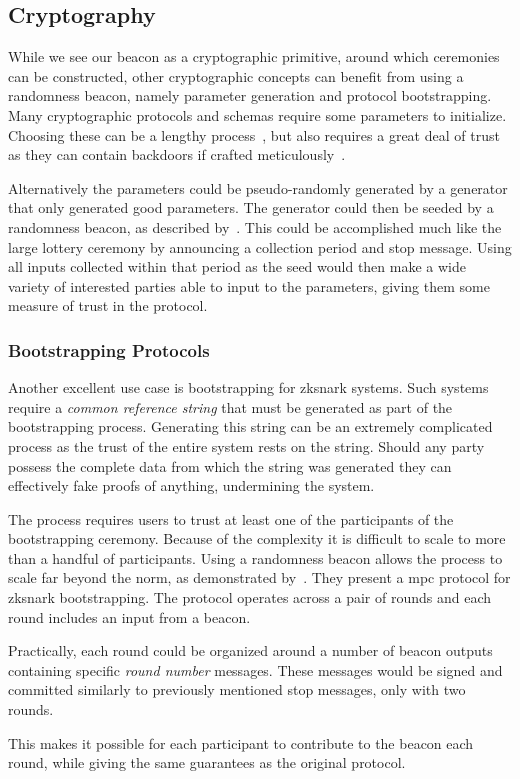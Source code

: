 \subsection{Cryptography}
While we see our beacon as a cryptographic primitive, around which ceremonies can be constructed, other cryptographic concepts can benefit from using a randomness beacon, namely parameter generation and protocol bootstrapping.
Many cryptographic protocols and schemas require some parameters to initialize.
Choosing these can be a lengthy process~\cite{mpcsnarks}, but also requires a great deal of trust as they can contain backdoors if crafted meticulously~\cite{nist2014backdoor}.

Alternatively the parameters could be pseudo-randomly generated by a generator that only generated good parameters.
The generator could then be seeded by a randomness beacon, as described by~\citet{baigneres2015trap}.
This could be accomplished much like the large lottery ceremony by announcing a collection period and stop message.
Using all inputs collected within that period as the seed would then make a wide variety of interested parties able to input to the parameters, giving them some measure of trust in the protocol.

\subsubsection{Bootstrapping Protocols}%
\label{ssub:bootstrapping_protocols}
Another excellent use case is bootstrapping for \gls{zksnark} systems.
Such systems require a \emph{common reference string} that must be generated as part of the bootstrapping process.
Generating this string can be an extremely complicated process as the trust of the entire system rests on the string.
Should any party possess the complete data from which the string was generated they can effectively fake proofs of anything, undermining the system.

The process requires users to trust at least one of the participants of the bootstrapping ceremony. Because of the complexity it is difficult to scale to more than a handful of participants.
Using a randomness beacon allows the process to scale far beyond the norm, as demonstrated by~\citet{mpcsnarks}.
They present a \acrshort{mpc} protocol for \acrshort{zksnark} bootstrapping.
The protocol operates across a pair of rounds and each round includes an input from a beacon. %

Practically, each round could be organized around a number of beacon outputs containing specific \textit{round number} messages.
These messages would be signed and committed similarly to previously mentioned stop messages, only with two rounds.

This makes it possible for each participant to contribute to the beacon each round, while giving the same guarantees as the original protocol.

